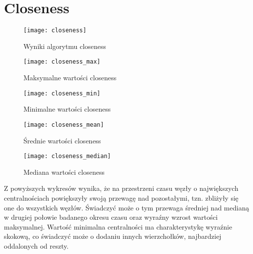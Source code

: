 \section{Closeness}
\FloatBarrier
\begin{figure}[h]
	\centering
	\texttt{[image: closeness]}
	\caption{Wyniki algorytmu closeness}
\end{figure}
\FloatBarrier\FloatBarrier
\begin{figure}[h]
	\centering
	\texttt{[image: closeness\_max]}
	\caption{Maksymalne wartości closeness}
\end{figure}
\FloatBarrier\FloatBarrier
\begin{figure}[h]
	\centering
	\texttt{[image: closeness\_min]}
	\caption{Minimalne wartości closeness}
\end{figure}
\FloatBarrier\FloatBarrier
\begin{figure}[h]
	\centering
	\texttt{[image: closeness\_mean]}
	\caption{Średnie wartości closeness}
\end{figure}
\FloatBarrier\FloatBarrier
\begin{figure}[h]
	\centering
	\texttt{[image: closeness\_median]}
	\caption{Mediana wartości closeness}
\end{figure}
\FloatBarrier
Z powyższych wykresów wynika, że na przestrzeni czasu węzły o największych centralnościach powiększyły swoją przewagę nad pozostałymi, tzn. zbliżyły się one do wszystkich węzłów. Świadczyć może o tym przewaga średniej nad medianą w drugiej połowie badanego okresu czasu oraz wyraźny wzrost wartości maksymalnej. Wartość minimalna centralności ma charakterystykę wyraźnie skokową, co świadczyć może o dodaniu innych wierzchołków, najbardziej oddalonych od reszty. 
\newpage
